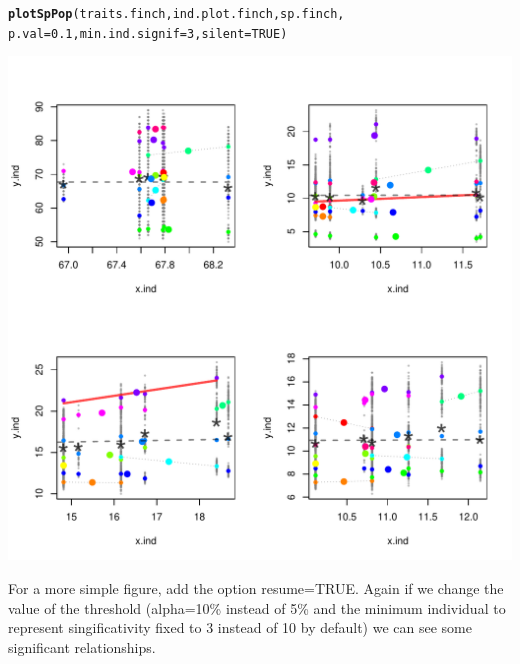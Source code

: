\documentclass[12pt]{article}\usepackage[]{graphicx}\usepackage[]{color}
\makeatletter
\def\maxwidth{ %
  \ifdim\Gin@nat@width>\linewidth
    \linewidth
  \else
    \Gin@nat@width
  \fi
}
\newcommand{\hlnum}[1]{\textcolor[rgb]{0.686,0.059,0.569}{#1}}%
\newcommand{\hlstd}[1]{\textcolor[rgb]{0.345,0.345,0.345}{#1}}%
\newcommand{\hlkwc}[1]{\textcolor[rgb]{0.333,0.667,0.333}{#1}}%
\newcommand{\hlkwd}[1]{\textcolor[rgb]{0.737,0.353,0.396}{\textbf{#1}}}%
\newenvironment{kframe}{%
 \def\at@end@of@kframe{}%
 \ifinner\ifhmode%
  \def\at@end@of@kframe{\end{minipage}}%
  \begin{minipage}{\columnwidth}%
 \fi\fi%
 \def\FrameCommand##1{\hskip\@totalleftmargin \hskip-\fboxsep
 \colorbox{shadecolor}{##1}\hskip-\fboxsep
     \hskip-\linewidth \hskip-\@totalleftmargin \hskip\columnwidth}%
 \MakeFramed {\advance\hsize-\width
   \@totalleftmargin\z@ \linewidth\hsize
   \@setminipage}}%
 {\par\unskip\endMakeFramed%
 \at@end@of@kframe}
\newenvironment{knitrout}{}{} %
\makeatother
\begin{document}
\begin{knitrout}
\color{fgcolor}\begin{kframe}
\begin{alltt}
\hlkwd{plotSpPop}\hlstd{(traits.finch, ind.plot.finch, sp.finch,}
           \hlkwc{p.val}\hlstd{=}\hlnum{0.1}\hlstd{,}  \hlkwc{min.ind.signif}\hlstd{=}\hlnum{3}\hlstd{,} \hlkwc{silent}\hlstd{=}\hlnum{TRUE}\hlstd{)}
\end{alltt}
\end{kframe}
\includegraphics[width=\maxwidth]{figure/unnamed-chunk-26} 

\end{knitrout}

\newpage

For a more simple figure, add the option resume=TRUE. Again if we change the value of the threshold (alpha=10\% instead of 5\% and the minimum individual to represent singificativity fixed to 3 instead of 10 by default) we can see some significant relationships.
\end{document}
